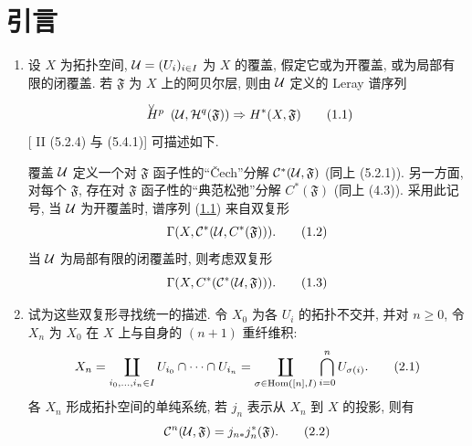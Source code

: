 \section*{引言}

\begin{enumerate}
\renewcommand{\labelenumi}{\theenumi.}
\item 设\pageoriginale{} $X$ 为拓扑空间, ${\mathcal U}=(U_i)_{i\in I}$ 为 $X$ 的覆盖,
假定它或为开覆盖, 或为局部有限的闭覆盖.
若 $\mathfrak{F}$ 为 $X$ 上的阿贝尔层, 则由 ${\mathcal U}$ 定义的 Leray 谱序列
\begin{equation*}
\Hv{p}(\Uu,\mathcal{H}^q(\mathfrak{F}))\Rightarrow H^{\ast}
(X,\mathfrak{F})\tag{1.1}
\end{equation*}
[\cite{sga4.exp.Vbis.bib.5} II (5.2.4) 与 (5.4.1)] 可描述如下.

覆盖 ${\mathcal U}$ 定义一个对 $\mathfrak{F}$ 函子性的“\v{C}ech”分解
$\mathcal{C}^{\ast}({\mathcal U},\mathfrak{F})$ (同上 (5.2.1)).
另一方面, 对每个 $\mathfrak{F}$, 存在对 $\mathfrak{F}$ 函子性的“典范松弛”分解
$C^{\ast}(\mathfrak{F})$ (同上 (4.3)).
采用此记号, 当 ${\mathcal U}$ 为开覆盖时, 谱序列 (\hyperref[Vbis.subsec1.1]{1.1}) 来自双复形
\begin{equation*}
\Gamma(X,\mathcal{C}^{\ast}({\mathcal U},C^{\ast}(\mathfrak{F}))){}.
\tag{1.2}
\end{equation*}
当 ${\mathcal U}$ 为局部有限的闭覆盖时, 则考虑双复形
\begin{equation*}
\Gamma(X,C^{\ast}(\mathcal{C}^{\ast}({\mathcal U},\mathfrak{F}))){}.
\tag{1.3}
\end{equation*}

\item 试为这些双复形寻找统一的描述.
令 $X_0$ 为各 $U_i$ 的拓扑不交并, 并对 $n\geq0$,
令 $X_n$ 为 $X_0$ 在 $X$ 上与自身的 $(n+1)$ 重纤维积:
\begin{equation*}
X_n=\mathop{\coprod}_{i_0,\dots,i_n\in I}U_{i_0}\cap\cdots\cap U_{i_n}
=\mathop{\coprod}_{\sigma\in\operatorname{Hom}([n],I)}
\mathop{\bigcap}_{i=0}^{n}U_{\sigma(i)}{}.\tag{2.1}
\end{equation*}
各 $X_n$ 形成拓扑空间的单纯系统, 若 $j_n$ 表示从 $X_n$ 到 $X$ 的投影, 则有
\begin{equation*}
\mathcal{C}^n({\mathcal U},\mathfrak{F})=j_{n\ast}j_n^{\ast}(\mathfrak{F}){}.
\tag{2.2}
\end{equation*}


\end{enumerate}
